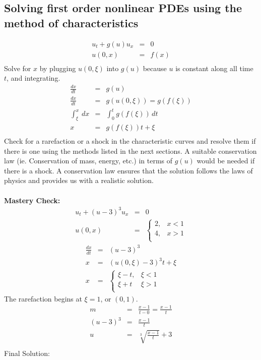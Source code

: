 \documentclass{article}
\def\d#1#2{\frac{d#1}{d#2}} %
\newcommand{\bea}{\begin{eqnarray*}}
\newcommand{\eea}{\end{eqnarray*}}
\begin{document}
\subsection{Solving first order nonlinear PDEs using the method of characteristics}
\bea
u_t + g(u)u_x &=& 0\\
u(0,x) &=& f(x)\\
\eea
Solve for $x$ by plugging $u(0,\xi)$  into $g(u)$ because $u$ is constant along all time $t$, and integrating.
\bea
\d{x}{t} &=& g(u)\\
\d{x}{t} &=&g( u(0,\xi)) = g(f(\xi))\\
\int_{\xi}^{x}{\,dx} &=& \int_{0}^{t}{g(f(\xi))\,dt}\\
x &=& g(f(\xi))t+\xi\\
\eea
Check for a rarefaction or a shock in the characteristic curves and resolve them if there is one using the methods listed in the next sections. A suitable conservation law (ie. Conservation of mass, energy, etc.) in terms of $g(u)$ would be needed if there is a shock. A conservation law ensures that the solution follows the laws of physics and provides us with a realistic solution.\\\\
\textbf{Mastery Check:}\\
\bea
u_t+(u-3)^3u_x &=& 0\\
u(0,x) &=& \begin{cases}
2, & x<1\\
4, & x>1\\
\end{cases}\eea
\bea
\d{x}{t} &=& (u-3)^3\\
x &=& (u(0,\xi)-3)^3t+\xi\\
x &=& \begin{cases}
\xi-t, & \xi<1\\
\xi+t & \xi>1\\
\end{cases}
\eea
The rarefaction begins at $\xi = 1$, or $(0,1)$.
\bea
m &=& \frac{x-1}{t-0} = \frac{x-1}{t}\\
(u-3)^3 &=& \frac{x-1}{t}\\
u &=& \sqrt[3]{\frac{x-1}{t}}+3\\
\eea
Final Solution:
\begin{center}
\end{center}
\end{document}
